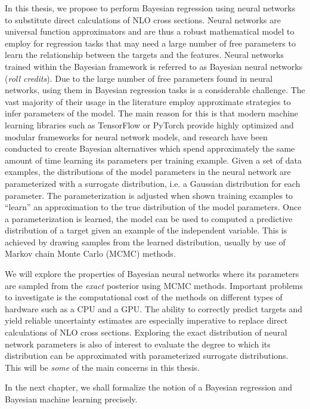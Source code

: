 In this thesis, we propose to perform Bayesian regression using neural networks to substitute direct calculations of NLO cross sections. Neural networks are universal function approximators \cite{universal_function_approximator} and are thus a robust mathematical model to employ for regression tasks that may need a large number of free parameters to learn the relationship between the targets and the features.
Neural networks trained within the Bayesian framework is referred to as Bayesian neural networks (\textit{roll credits}). Due to the large number of free parameters found in neural networks, using them in Bayesian regression tasks is a considerable challenge. The vast majority of their usage in the literature employ approximate strategies to infer parameters of the model. The main reason for this is that modern machine learning libraries such as TensorFlow or PyTorch provide highly optimized and modular frameworks for neural network models, and research have been conducted to create Bayesian alternatives which spend approximately the same amount of time learning its parameters per training example. Given a set of data examples, the distributions of the model parameters in the neural network are parameterized with a surrogate distribution, i.e. a Gaussian distribution for each parameter. The parameterization is adjusted when shown training examples to ``learn'' an approximation to the true distribution of the model parameters. Once a parameterization is learned, the model can be used to computed a predictive distribution of a target given an example of the independent variable. This is achieved by drawing samples from the learned distribution, usually by use of Markov chain Monte Carlo (MCMC) methods. 

We will explore the properties of Bayesian neural networks where its parameters are sampled from the \textit{exact} posterior using MCMC methods. Important problems to investigate is the computational cost of the methods on different types of hardware such as a CPU and a GPU. The ability to correctly predict targets and yield reliable uncertainty estimates are especially imperative to replace direct calculations of NLO cross sections. Exploring the exact distribution of neural network parameters is also of interest to evaluate the degree to which its distribution can be approximated with parameterized surrogate distributions.
This will be \textit{some} of the main concerns in this thesis. 

In the next chapter, we shall formalize the notion of a Bayesian regression and Bayesian machine learning precisely.






